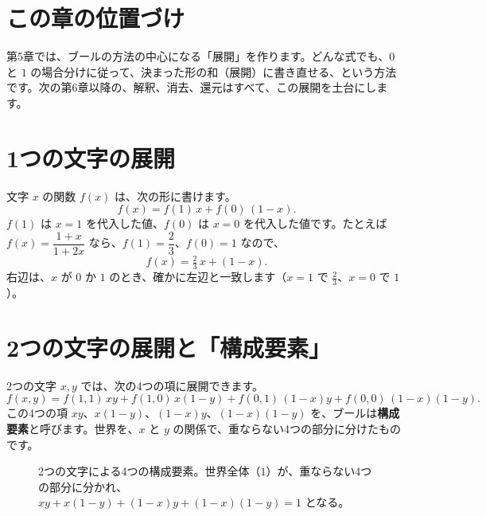 \documentclass[a4paper,11pt,openany]{ltjsbook}
\begin{document}
\section{この章の位置づけ}

第5章では、ブールの方法の中心になる「展開」を作ります。どんな式でも、$0$ と $1$ の場合分けに従って、決まった形の和（展開）に書き直せる、という方法です。次の第6章以降の、解釈、消去、還元はすべて、この展開を土台にします。

\section{1つの文字の展開}

文字 $x$ の関数 $f(x)$ は、次の形に書けます。
\[
f(x)=f(1)\,x+f(0)\,(1-x).
\]
$f(1)$ は $x=1$ を代入した値、$f(0)$ は $x=0$ を代入した値です。たとえば $f(x)=\dfrac{1+x}{1+2x}$ なら、$f(1)=\dfrac23$、$f(0)=1$ なので、
\[
f(x)=\tfrac23\,x+(1-x).
\]
右辺は、$x$ が $0$ か $1$ のとき、確かに左辺と一致します（$x=1$ で $\tfrac23$、$x=0$ で $1$）。

\section{2つの文字の展開と「構成要素」}

2つの文字 $x,y$ では、次の4つの項に展開できます。
\[
f(x,y)=f(1,1)\,xy+f(1,0)\,x(1-y)+f(0,1)\,(1-x)y+f(0,0)\,(1-x)(1-y).
\]
この4つの項 $xy$、$x(1-y)$、$(1-x)y$、$(1-x)(1-y)$ を、ブールは\textbf{構成要素}と呼びます。世界を、$x$ と $y$ の関係で、重ならない4つの部分に分けたものです。

\begin{figure}[htbp]
\centering
{}
\caption{2つの文字による4つの構成要素。世界全体（$1$）が、重ならない4つの部分に分かれ、$xy+x(1-y)+(1-x)y+(1-x)(1-y)=1$ となる。}
\end{figure}
\end{document}
